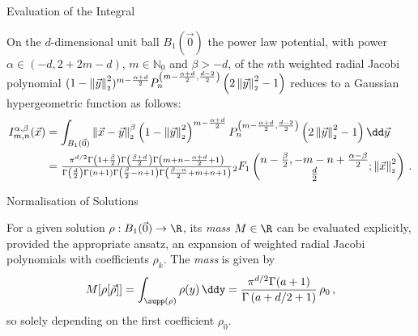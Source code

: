 \documentclass[aspectratio=169, hyperref={colorlinks=true}]{beamer}
\begin{document}
  \begin{frame}{Evaluation of the Integral}
    \begin{theorem}
      On the $d$-dimensional unit ball $B_1(\vec{0})$ the power law potential, with power $\alpha \in(-d,2+2m-d)$, $m\in\mathbb{N}_0$ and $\beta>-d$, of the $n$th weighted radial Jacobi polynomial $(1-\left\lVert\vec{y}\right\rVert_{\scriptscriptstyle 2}^2)^{m-\frac{\alpha+d}{2}}P_n^{\left(m-\frac{\alpha+d}{2},\frac{d-2}{2}\right)}\left(2 \left\lVert\vec{y}\right\rVert_{\scriptscriptstyle 2}^2 - 1\right)$ reduces to a Gaussian hypergeometric function as follows:
      \begin{align*}
        I_{m,n}^{\alpha,\beta}(\vec{x}) & = \int_{B_1(\vec{0})} \norm{\vec{x}-\vec{y}}^\beta \left(1-\norm{\vec{y}}^2\right)^{m-\frac{\alpha+d}{2}} P_{n}^{\left(m-\frac{\alpha+d}{2},\frac{d-2}{2}\right)}\left(\jacobiarg{y}\right) \dd\vec{y}                                                                                                                                                                                                             \\
                                        & = \tfrac{\pi ^{d/2} \Gamma \left(1+\frac{\beta}{2}\right) \Gamma \left(\frac{\beta+d}{2}\right) \Gamma \left(m+n-\frac{\alpha+d}{2}+1\right)}{\Gamma \left(\frac{d}{2}\right) \Gamma (n+1) \Gamma \left(\frac{\beta}{2}-n+1\right) \Gamma \left(\frac{\beta-\alpha}{2}+m+n+1\right)}{}_2F_1\left(\begin{matrix}n-\frac{\beta}{2}, -m-n+\frac{\alpha-\beta}{2} \\\frac{d}{2}\end{matrix};\norm{\vec{x}}^2\right)\,.
      \end{align*}
    \end{theorem}
  \end{frame}

  \begin{frame}{Normalisation of Solutions}
    \begin{lemma}
      For a given solution $\rho: B_1(\vec{0}) \to \R$, its \textit{mass} $M \in \R$ can be evaluated explicitly, provided the appropriate ansatz, an expansion of weighted radial Jacobi polynomials with coefficients $\rho_k$. The \textit{mass} is given by
      \begin{align*}
        M[\rho[\vec{\rho}]] = \int_{\supp(\rho)} \rho(y) \,\ddy = \frac{\pi^{{d/2}}\Gamma (a+1)}{\Gamma \left(a+{d/2}+1\right)}\, \rho_0\,,
      \end{align*}
      so solely depending on the first coefficient $\rho_0$.
    \end{lemma}
  \end{frame}
\end{document}
